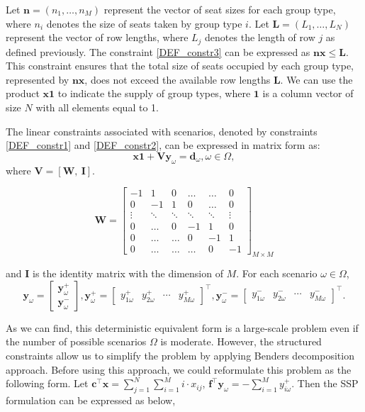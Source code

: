 Let $\mathbf{n} = (n_1, \ldots, n_M)$ represent the vector of seat sizes for each group type, where $n_i$ denotes the size of seats taken by group type $i$. Let $\mathbf{L} = (L_1, \ldots, L_N)$ represent the vector of row lengths, where $L_j$ denotes the length of row $j$ as defined previously.
The constraint \eqref{DEF_constr3} can be expressed as $\mathbf{n} \mathbf{x} \leq \mathbf{L}$. This constraint ensures that the total size of seats occupied by each group type, represented by $\mathbf{n} \mathbf{x}$, does not exceed the available row lengths $\mathbf{L}$. We can use the product $\mathbf{x} \mathbf{1}$ to indicate the supply of group types, where $\mathbf{1}$ is a column vector of size $N$ with all elements equal to 1. 

The linear constraints associated with scenarios, denoted by constraints \eqref{DEF_constr1} and \eqref{DEF_constr2}, can be expressed in matrix form as:
\[\mathbf{x} \mathbf{1} + \mathbf{V} \mathbf{y}_\omega = \mathbf{d}_\omega, \omega\in \Omega,\]
where $\mathbf{V} = [\mathbf{W}, ~\mathbf{I}]$.


$$
\mathbf{W}=\left[\begin{array}{cccccc}
-1 & 1 & 0 & \ldots & \ldots & 0 \\
0 & -1 & 1 &    0   & \ldots & 0 \\
\vdots & \ddots & \ddots & \ddots & \ddots & \vdots \\
0  & \ldots   &  0  & -1 & 1 & 0 \\
0  & \ldots   &  \ldots  &  0 &  -1 & 1 \\
0 & \ldots & \ldots & \ldots & 0 & -1
\end{array}\right]_{M \times M}
$$


and $\mathbf{I}$ is the identity matrix with the dimension of $M$. For each scenario $\omega \in \Omega$,
$$
\mathbf{y}_{\omega}=\left[\begin{array}{l}
\mathbf{y}_{\omega}^{+} \\
\mathbf{y}_{\omega}^{-}
\end{array}\right], \mathbf{y}_{\omega}^{+}=\left[\begin{array}{lllll}y_{1 \omega}^{+} & y_{2 \omega}^{+} & \cdots & y_{M \omega}^{+}\end{array}\right]^{\intercal}, \mathbf{y}_{\omega}^{-}=\left[\begin{array}{llll}y_{1 \omega}^{-} & y_{2 \omega}^{-} & \cdots & y_{M \omega}^{-}\end{array}\right]^{\intercal}.
$$

As we can find, this deterministic equivalent form is a large-scale problem even if the number of possible scenarios $\Omega$ is moderate. However, the structured constraints allow us to simplify the problem by applying Benders decomposition approach. Before using this approach, we could reformulate this problem as the following form. Let $\mathbf{c}^{\intercal}\mathbf{x} = \sum_{j =1}^{N} \sum_{i=1}^M i \cdot x_{ij}$, $\mathbf{f}^{\intercal}\mathbf{y}_{\omega} = -\sum_{i=1}^{M} y_{i \omega}^{+}$. Then the SSP formulation can be expressed as below,

